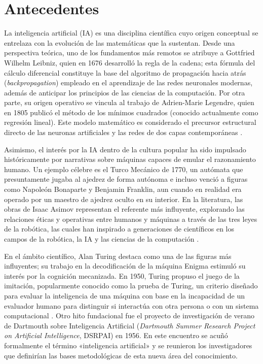 \section{Antecedentes}

La inteligencia artificial (IA) es una disciplina científica cuyo origen conceptual se entrelaza con la evolución de las
matemáticas que la sustentan. Desde una perspectiva teórica, uno de los fundamentos más remotos se atribuye a Gottfried Wilhelm Leibniz, 
quien en 1676 desarrolló la regla de la cadena; esta fórmula del cálculo diferencial constituye la base del algoritmo de propagación hacia atrás 
(\textit{backpropagation}) empleado en el aprendizaje de las redes neuronales modernas, además de anticipar los principios de las ciencias
de la computación. Por otra parte, su origen operativo se vincula al trabajo de Adrien-Marie Legendre, quien en 1805 publicó 
el método de los mínimos cuadrados (conocido actualmente como regresión lineal). Este modelo matemático es considerado el precursor estructural 
directo de las neuronas artificiales y las redes de dos capas contemporáneas \parencite{schmidhuber2022annotated}.
\medskip

Asimismo, el interés por la IA dentro de la cultura popular ha sido impulsado históricamente por narrativas sobre máquinas capaces de emular el razonamiento humano. 
Un ejemplo célebre es el Turco Mecánico de 1770, un autómata que presuntamente jugaba al ajedrez de forma autónoma e incluso venció a figuras como Napoleón Bonaparte 
y Benjamin Franklin, aun cuando en realidad era operado por un maestro de ajedrez oculto en su interior. En la literatura, las obras de Isaac Asimov representan el referente 
más influyente, explorando las relaciones éticas y operativas entre humanos y máquinas a través de las tres leyes de la robótica, las cuales han inspirado a generaciones de 
científicos en los campos de la robótica, la IA y las ciencias de la computación \parencite{haenlein2019brief}.
\medskip

En el ámbito científico, Alan Turing destaca como una de las figuras más influyentes; su trabajo en la decodificación de la máquina Enigma estimuló su interés por la cognición mecanizada. 
En 1950, Turing propuso el juego de la imitación, popularmente conocido como la prueba de Turing, un criterio diseñado para evaluar la inteligencia de una máquina con base en la 
incapacidad de un evaluador humano para distinguir si interactúa con otra persona o con un sistema computacional \parencite{turing1950computing}. Otro hito fundacional fue el proyecto de investigación de verano de 
Dartmouth sobre Inteligencia Artificial (\textit{Dartmouth Summer Research Project on Artificial Intelligence}, DSRPAI) en 1956. En este encuentro se acuñó formalmente el término 
«inteligencia artificial» y se reunieron los investigadores que definirían las bases metodológicas de esta nueva área del conocimiento.
\medskip

